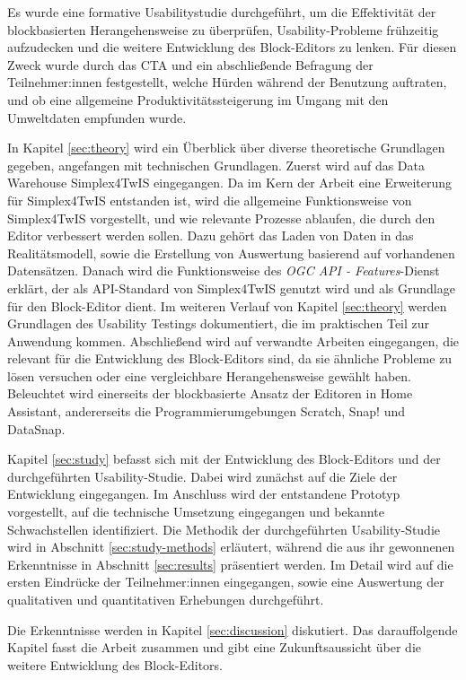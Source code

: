 Es wurde eine formative Usabilitystudie durchgeführt, um die Effektivität der blockbasierten Herangehensweise zu überprüfen, Usability-Probleme frühzeitig aufzudecken und die weitere Entwicklung des Block-Editors zu lenken. Für diesen Zweck wurde durch das \acf{CTA} und ein abschließende Befragung der Teilnehmer:innen festgestellt, welche Hürden während der Benutzung auftraten, und ob eine allgemeine Produktivitätssteigerung im Umgang mit den Umweltdaten empfunden wurde.

\pskip
In Kapitel \ref{sec:theory} wird ein Überblick über diverse theoretische Grundlagen gegeben, angefangen mit technischen Grundlagen. Zuerst wird auf das Data Warehouse Simplex4TwIS eingegangen. Da im Kern der Arbeit eine Erweiterung für Simplex4TwIS entstanden ist, wird die allgemeine Funktionsweise von Simplex4TwIS vorgestellt, und wie relevante Prozesse ablaufen, die durch den Editor verbessert werden sollen. Dazu gehört das Laden von Daten in das Realitätsmodell, sowie die Erstellung von Auswertung basierend auf vorhandenen Datensätzen. Danach wird die Funktionsweise des \textit{\acs{OGC} \acs{API} - Features}-Dienst erklärt, der als \acs{API}-Standard von Simplex4TwIS genutzt wird und als Grundlage für den Block-Editor dient. Im weiteren Verlauf von Kapitel \ref{sec:theory} werden Grundlagen des Usability Testings dokumentiert, die im praktischen Teil zur Anwendung kommen. Abschließend wird auf verwandte Arbeiten eingegangen, die relevant für die Entwicklung des Block-Editors sind, da sie ähnliche Probleme zu lösen versuchen oder eine vergleichbare Herangehensweise gewählt haben. Beleuchtet wird einerseits der blockbasierte Ansatz der Editoren in Home Assistant, andererseits die Programmierumgebungen Scratch, Snap! und DataSnap.

Kapitel \ref{sec:study} befasst sich mit der Entwicklung des Block-Editors und der durchgeführten Usability-Studie. Dabei wird zunächst auf die Ziele der Entwicklung eingegangen. Im Anschluss wird der entstandene Prototyp vorgestellt, auf die technische Umsetzung eingegangen und bekannte Schwachstellen identifiziert. Die Methodik der durchgeführten Usability-Studie wird in Abschnitt \ref{sec:study-methods} erläutert, während die aus ihr gewonnenen Erkenntnisse in Abschnitt \ref{sec:results} präsentiert werden. Im Detail wird auf die ersten Eindrücke der Teilnehmer:innen eingegangen, sowie eine Auswertung der qualitativen und quantitativen Erhebungen durchgeführt.

Die Erkenntnisse werden in Kapitel \ref{sec:discussion} diskutiert. Das darauffolgende Kapitel fasst die Arbeit zusammen und gibt eine Zukunftsaussicht über die weitere Entwicklung des Block-Editors.
